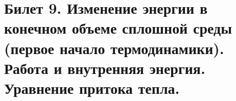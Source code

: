 \newpage
\section{Билет 9. Изменение энергии в конечном объеме сплошной среды (первое начало термодинамики). Работа и внутренняя энергия. Уравнение притока тепла.}